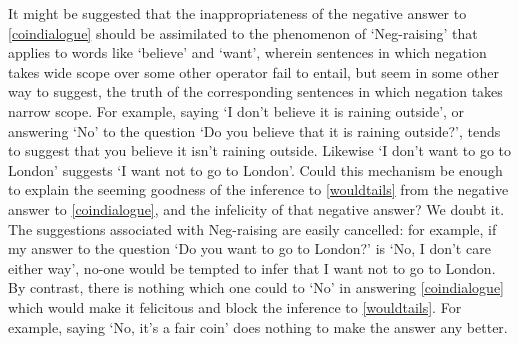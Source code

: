 \documentclass[If.tex]{subfiles}
\begin{document}
It might be suggested that the inappropriateness of the negative answer to \ref{coindialogue} should be assimilated to the phenomenon of ‘Neg-raising’ that applies to words like ‘believe’ and ‘want’, wherein sentences in which negation takes wide scope over some other operator fail to entail, but seem in some other way to suggest, the truth of the corresponding sentences in which negation takes narrow scope. For example, saying `I don't believe it is raining outside', or answering ‘No’ to the question ‘Do you believe that it is raining outside?’, tends to suggest that you believe it isn't raining outside. Likewise `I don't want to go to London' suggests ‘I want not to go to London’. Could this mechanism be enough to explain the seeming goodness of the inference to \ref{wouldtails} from the negative answer to \ref{coindialogue}, and the infelicity of that negative answer? We doubt it. The suggestions associated with Neg-raising are easily cancelled: for example, if my answer to the question ‘Do you want to go to London?’ is `No, I don't care either way', no-one would be tempted to infer that I want not to go to London. By contrast, there is nothing which one could to ‘No’ in answering \ref{coindialogue} which would make it felicitous and block the inference to \ref{wouldtails}. For example, saying `No, it's a fair coin' does nothing to make the answer any better.
\end{document}
